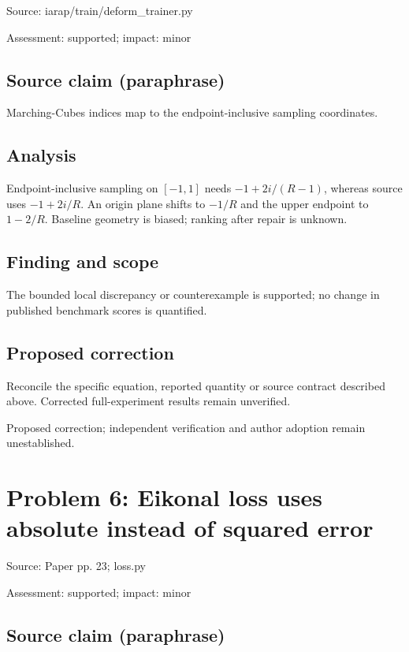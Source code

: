 \documentclass[11pt]{article}
\begin{document}
Source: iarap/train/deform\_trainer.py

Assessment: supported; impact: minor

\subsection*{Source claim (paraphrase)}

Marching-Cubes indices map to the endpoint-inclusive sampling coordinates.

\subsection*{Analysis}

Endpoint-inclusive sampling on \([-1,1]\) needs \(-1+2i/(R-1)\), whereas source uses \(-1+2i/R\). An origin plane shifts to \(-1/R\) and the upper endpoint to \(1-2/R\). Baseline geometry is biased; ranking after repair is unknown.

\subsection*{Finding and scope}

The bounded local discrepancy or counterexample is supported; no change in published benchmark scores is quantified.

\subsection*{Proposed correction}

Reconcile the specific equation, reported quantity or source contract described above. Corrected full-experiment results remain unverified.

Proposed correction; independent verification and author adoption remain unestablished.

\section*{Problem 6: Eikonal loss uses absolute instead of squared error}

Source: Paper pp. 23; loss.py

Assessment: supported; impact: minor

\subsection*{Source claim (paraphrase)}
\end{document}
